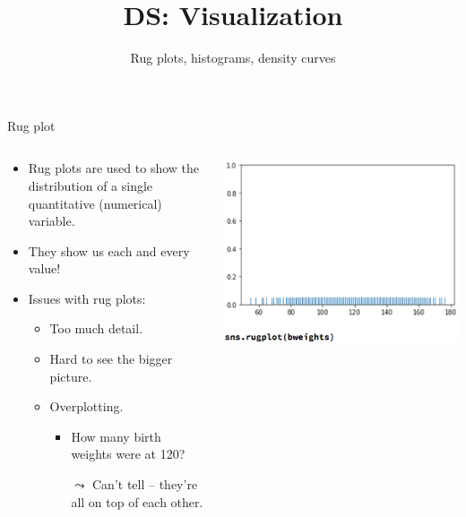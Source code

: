 \documentclass[aspectratio=169]{../latex_main/tntbeamer}  %
\title[Visualization]{DS: Visualization}
\subtitle{Rug plots, histograms, density curves}
\begin{document}
	
	\maketitle
    \begin{frame}{Rug plot}
        \begin{columns}
            \begin{column}{.5\textwidth}
                    \begin{itemize}
                        \item Rug plots are used to show the distribution of a single quantitative (numerical) variable.
                        \item They show us each and every value!
                        \item Issues with rug plots:
                        \begin{itemize}
                            \item Too much detail.
                            \item Hard to see the bigger picture.
                            \item Overplotting.
                            \begin{itemize}
                                \item How many birth weights were at 120?
                                \item[$\leadsto$] Can’t tell – they’re all on top of each other.
                            \end{itemize}
                        \end{itemize}
                    \end{itemize}
            \end{column}
            
            
            \begin{column}{.4\textwidth}
            
                       \centering
                       \includegraphics[scale=.35]{Bild26}
                       
            \end{column}
        \end{columns}
    \end{frame}
    
\end{document}
